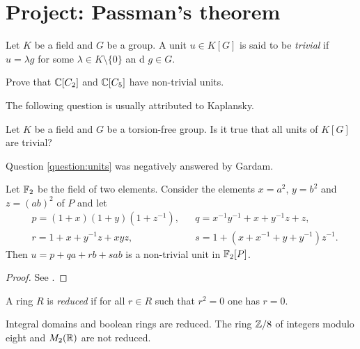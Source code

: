 \section{Project: Passman's theorem}
\label{section:Passman}


Let $K$ be a field and $G$ be a group. A unit $u\in K[G]$ is said
to be \emph{trivial} if $u=\lambda g$ for some $\lambda\in K\setminus\{0\}$ an
d
$g\in G$.

\begin{exercise}
\label{xca:non_trivial:C2andC5}
        Prove that $\mathbb{C}[C_2]$ and $\mathbb{C}[C_5]$ have non-trivial units.
\end{exercise}

The following question is usually attributed to Kaplansky.

\begin{question}
        \label{question:units}
        Let $K$ be a field and $G$ be a torsion-free group. Is it true that all
        units of $K[G]$ are
        trivial?
\end{question}

Question \ref{question:units} was negatively answered by Gardam.

\begin{theorem}[Gardam]
\label{thm:Gardam_char2}
    Let $\mathbb{F}_2$ be the field of two elements. Consider the elements
    $x=a^2$, $y=b^2$ and $z=(ab)^2$ of $P$ and let
    \begin{align*}
        &p=(1+x)(1+y)(1+z^{-1}),
        &&q = x^{-1}y^{-1}+x+y^{-1}z+z,\\
        &r = 1+x+y^{-1}z+xyz,
        &&s=1+(x+x^{-1}+y+y^{-1})z^{-1}.
    \end{align*}
    Then $u=p+qa+rb+sab$ is a non-trivial unit in $\mathbb{F}_2[P]$.
\end{theorem}

\begin{proof}
    See \cite{MR4334981}.
\end{proof}

\begin{definition}
A ring $R$ is \emph{reduced} if for all $r\in R$ such that 
$r^2=0$ one has $r=0$.
\end{definition}

Integral domains and boolean rings are reduced. The ring $\mathbb{Z}/8$ of integers
modulo eight 
and $M_2(\mathbb{R})$ are not reduced. 

